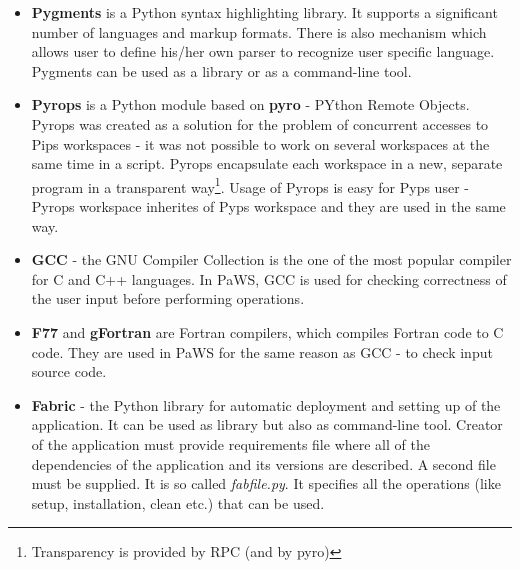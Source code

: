 \begin{itemize}
  \item {\bf Pygments}\cite{pygments} is a Python syntax highlighting library. It supports a significant number of languages and markup formats. There is also mechanism which allows user to define his/her own parser to recognize user specific language. Pygments can be used as a library or as a command-line tool.
  \item {\bf Pyrops} is a Python module based on {\bf pyro} - PYthon Remote Objects\cite{pyro}. Pyrops was created as a solution for the problem of concurrent accesses to Pips workspaces - it was not possible to work on several workspaces at the same time in a script\cite{pyps_doc}. Pyrops encapsulate each workspace in a new, separate program in a transparent way\footnote{Transparency is provided by RPC (and by pyro)\cite{pyps_pass_manager}}. Usage of Pyrops is easy for Pyps user - Pyrops workspace inherites of Pyps workspace and they are used in the same way.
  \item {\bf GCC}\cite{gcc} - the GNU Compiler Collection is the one of the most popular compiler for C and C++ languages. In PaWS, GCC is used for checking correctness of the user input before performing operations.
  \item {\bf F77}\cite{fortran77} and {\bf gFortran}\cite{gfortran} are Fortran compilers, which compiles Fortran code to C code. They are used in PaWS for the same reason as GCC - to check input source code.
  \item {\bf Fabric}\cite{fabric} - the Python library for automatic deployment and setting up of the application. It can be used as library but also as command-line tool. Creator of the application must provide requirements file where all of the dependencies of the application and its versions are described. A second file must be supplied. It is so called \emph{fabfile.py}. It specifies all the operations (like setup, installation, clean etc.) that can be used.
\end{itemize}




